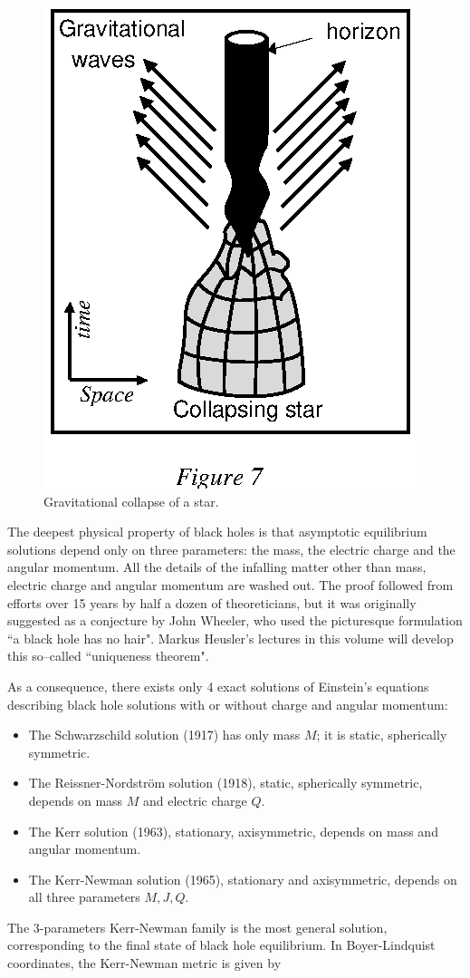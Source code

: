 \documentclass{lamuphys}
\begin{document}
\begin{figure}[tb]
  \begin{center}
    \leavevmode
    \includegraphics{coll.ps}       
    \caption{Gravitational collapse of a star.}
  \end{center}
\end{figure}
The deepest physical property of black holes is that asymptotic
equilibrium solutions depend only on three parameters:
the mass, the electric charge and the angular momentum. All the
details of the infalling matter other than mass, electric charge and 
angular momentum are washed out. The proof followed from efforts
over 15 years by half a dozen of theoreticians, but it was originally suggested as
a conjecture by John Wheeler, who used the picturesque formulation ``a black
hole has no hair".
Markus Heusler's lectures in this volume will develop this so--called
``uniqueness theorem".  

As a consequence, there exists only 4 exact solutions of Einstein's equations
describing black hole solutions with or without charge and angular momentum:

 \begin{itemize}  
\item The Schwarzschild solution (1917) has only mass $M$; it is static,
spherically symmetric.
  \item  The Reissner-Nordstr\"om solution (1918),
static, spherically symmetric, depends on mass $M$ and electric charge $Q$. 
\item The Kerr solution (1963), stationary, axisymmetric,  depends on mass and
angular momentum.
\item The Kerr-Newman solution (1965),  stationary and axisymmetric, depends on
all three parameters $M, J, Q$. 
\end{itemize}
The 3-parameters Kerr-Newman family is the most general solution,
corresponding to the final state of black hole equilibrium. In
Boyer-Lindquist coordinates, the Kerr-Newman metric is given
by
\end{document}
